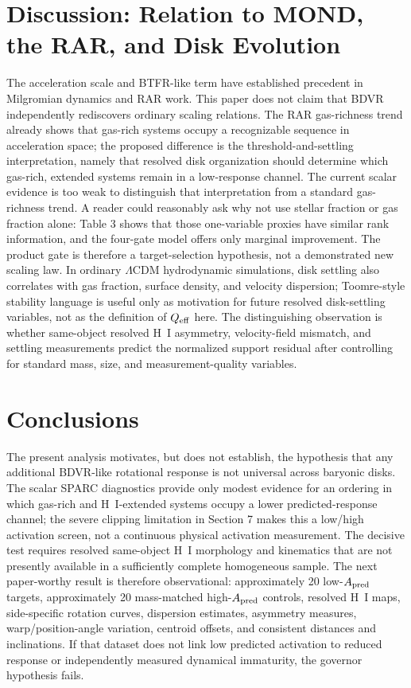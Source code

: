 \documentclass[11pt]{article}
\begin{document}
\section{Discussion: Relation to MOND, the RAR, and Disk Evolution}

The acceleration scale and BTFR-like term have established precedent in Milgromian dynamics and RAR work. This paper does not claim that BDVR independently rediscovers ordinary scaling relations. The RAR gas-richness trend already shows that gas-rich systems occupy a recognizable sequence in acceleration space; the proposed difference is the threshold-and-settling interpretation, namely that resolved disk organization should determine which gas-rich, extended systems remain in a low-response channel. The current scalar evidence is too weak to distinguish that interpretation from a standard gas-richness trend. A reader could reasonably ask why not use stellar fraction or gas fraction alone: Table 3 shows that those one-variable proxies have similar rank information, and the four-gate model offers only marginal improvement. The product gate is therefore a target-selection hypothesis, not a demonstrated new scaling law. In ordinary $\Lambda$CDM hydrodynamic simulations, disk settling also correlates with gas fraction, surface density, and velocity dispersion; Toomre-style stability language is useful only as motivation for future resolved disk-settling variables, not as the definition of $Q_{\rm eff}$ here. The distinguishing observation is whether same-object resolved H~I asymmetry, velocity-field mismatch, and settling measurements predict the normalized support residual after controlling for standard mass, size, and measurement-quality variables.

\section{Conclusions}

\begin{sloppypar}
The present analysis motivates, but does not establish, the hypothesis that any additional BDVR-like rotational response is not universal across baryonic disks. The scalar SPARC diagnostics provide only modest evidence for an ordering in which gas-rich and H~I-extended systems occupy a lower predicted-response channel; the severe clipping limitation in Section 7 makes this a low/high activation screen, not a continuous physical activation measurement. The decisive test requires resolved same-object H~I morphology and kinematics that are not presently available in a sufficiently complete homogeneous sample. The next paper-worthy result is therefore observational: approximately 20 low-$A_{\rm pred}$ targets, approximately 20 mass-matched high-$A_{\rm pred}$ controls, resolved H~I maps, side-specific rotation curves, dispersion estimates, asymmetry measures, warp/position-angle variation, centroid offsets, and consistent distances and inclinations. If that dataset does not link low predicted activation to reduced response or independently measured dynamical immaturity, the governor hypothesis fails.
\end{sloppypar}
\end{document}
